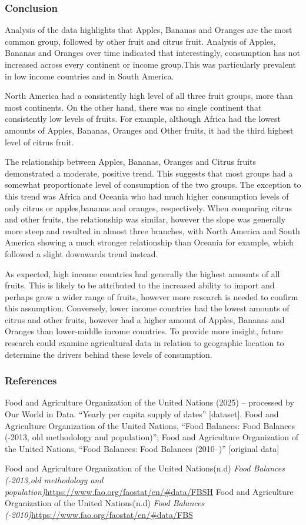 \documentclass[
]{article}
\begin{document}
\subsubsection{Conclusion}\label{conclusion}

Analysis of the data highlights that Apples, Bananas and Oranges are the
most common group, followed by other fruit and citrus fruit. Analysis of
Apples, Bananas and Oranges over time indicated that interestingly,
consumption has not increased across every continent or income
group.This was particularly prevalent in low income countries and in
South America.

North America had a consistently high level of all three fruit groups,
more than most continents. On the other hand, there was no single
continent that consistently low levels of fruits. For example, although
Africa had the lowest amounts of Apples, Bananas, Oranges and Other
fruits, it had the third highest level of citrus fruit.

The relationship between Apples, Bananas, Oranges and Citrus fruits
demonstrated a moderate, positive trend. This suggests that most groups
had a somewhat proportionate level of consumption of the two groups. The
exception to this trend was Africa and Oceania who had much higher
consumption levels of only citrus or apples,bananas and oranges,
respectively. When comparing citrus and other fruits, the relationship
was similar, however the slope was generally more steep and resulted in
almost three branches, with North America and South America showing a
much stronger relationship than Oceania for example, which followed a
slight downwards trend instead.

As expected, high income countries had generally the highest amounts of
all fruits. This is likely to be attributed to the increased ability to
import and perhaps grow a wider range of fruits, however more research
is needed to confirm this assumption. Conversely, lower income countries
had the lowest amounts of citrus and other fruits, however had a higher
amount of Apples, Bananas and Oranges than lower-middle income
countries. To provide more insight, future research could examine
agricultural data in relation to geographic location to determine the
drivers behind these levels of consumption.

\subsubsection{References}\label{references}

Food and Agriculture Organization of the United Nations (2025) --
processed by Our World in Data. ``Yearly per capita supply of dates''
{[}dataset{]}. Food and Agriculture Organization of the United Nations,
``Food Balances: Food Balances (-2013, old methodology and
population)''; Food and Agriculture Organization of the United Nations,
``Food Balances: Food Balances (2010--)'' {[}original data{]}

Food and Agriculture Organization of the United Nations(n.d) \emph{Food
Balances (-2013,old methodology and
population)}\url{https://www.fao.org/faostat/en/\#data/FBSH} Food and
Agriculture Organization of the United Nations(n.d) \emph{Food Balances
(-2010)}\url{https://www.fao.org/faostat/en/\#data/FBS}
\end{document}
